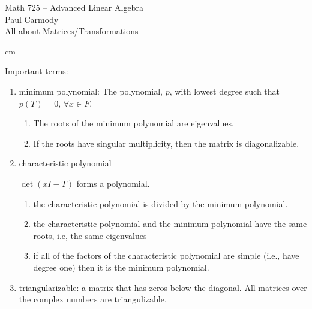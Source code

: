 \documentclass[11pt]{amsart}
\theoremstyle{definition}  %
\begin{document}
\begin{center}
\Large{Math 725 -- Advanced Linear Algebra}\\
\large{Paul Carmody}\\
All about Matrices/Transformations
\end{center}

 cm

Important terms:
\begin{enumerate}
	\item minimum polynomial: The polynomial, $p$, with lowest degree such that $p(T)=0, \, \forall x\in F$.
	\begin{enumerate}[label=\roman*)]
		\item The roots of the minimum polynomial are eigenvalues.
		\item If the roots have singular multiplicity, then the matrix is diagonalizable.
	
	\end{enumerate}
		
	\item characteristic polynomial
	
		$\det(xI-T)$ forms a polynomial.
		\begin{enumerate}[label=\roman*)]
			\item the characteristic polynomial is divided by the minimum polynomial.
			\item the characteristic polynomial and the minimum polynomial have the same roots, i.e, the same eigenvalues
			\item if all of the factors of the characteristic polynomial are simple (i.e., have degree one) then it is the minimum polynomial.
		\end{enumerate}
		
	\item triangularizable: a matrix that has zeros below the diagonal.  All matrices over the complex numbers are triangulizable.
	

\end{enumerate}
\end{document}
